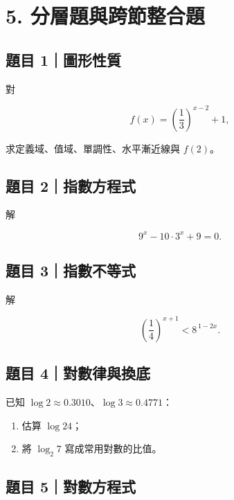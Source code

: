 \documentclass[11pt,a4paper]{article}
\providecommand{\tightlist}{%
  \setlength{\itemsep}{0pt}\setlength{\parskip}{0pt}}
\begin{document}
\section{5. 分層題與跨節整合題}\label{ux5206ux5c64ux984cux8207ux8de8ux7bc0ux6574ux5408ux984c}

\subsection{題目 1｜圖形性質}\label{ux984cux76ee-1ux5716ux5f62ux6027ux8cea}

對

\[
f(x)=\left(\frac13\right)^{x-2}+1,
\]

求定義域、值域、單調性、水平漸近線與 \(f(2)\)。

\subsection{題目 2｜指數方程式}\label{ux984cux76ee-2ux6307ux6578ux65b9ux7a0bux5f0f}

解

\[
9^x-10\cdot3^x+9=0.
\]

\subsection{題目 3｜指數不等式}\label{ux984cux76ee-3ux6307ux6578ux4e0dux7b49ux5f0f}

解

\[
\left(\frac14\right)^{x+1}<8^{\,1-2x}.
\]

\subsection{題目 4｜對數律與換底}\label{ux984cux76ee-4ux5c0dux6578ux5f8bux8207ux63dbux5e95}

已知 \(\log2\approx0.3010\)、\(\log3\approx0.4771\)：

\begin{enumerate}
\def\labelenumi{\arabic{enumi}.}
\tightlist
\item
  估算 \(\log24\)；
\item
  將 \(\log_2 7\) 寫成常用對數的比值。
\end{enumerate}

\subsection{題目 5｜對數方程式}\label{ux984cux76ee-5ux5c0dux6578ux65b9ux7a0bux5f0f}
\end{document}
